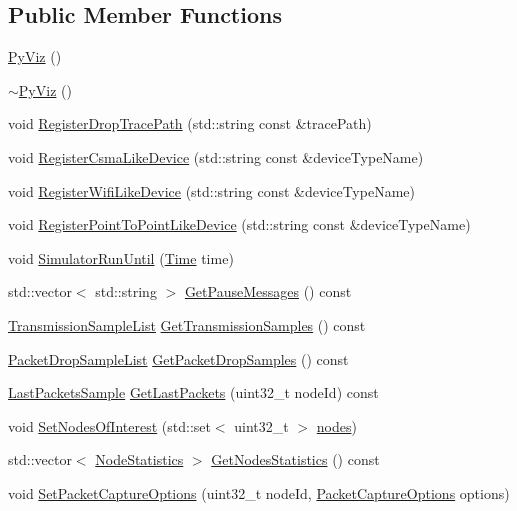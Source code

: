 \subsection*{Public Member Functions}
\begin{DoxyCompactItemize}
\item 
\hyperlink{classns3_1_1PyViz_ac8be400fd6c2f4054885d6b5a6015b81}{Py\+Viz} ()
\item 
\hyperlink{classns3_1_1PyViz_a65826ece1bbd08783e4aef13455aeb0d}{$\sim$\+Py\+Viz} ()
\item 
void \hyperlink{classns3_1_1PyViz_a0c6cee77874121b73c676d6a5d258fbf}{Register\+Drop\+Trace\+Path} (std\+::string const \&trace\+Path)
\item 
void \hyperlink{classns3_1_1PyViz_a222dd813791398f8bf76371dc9288772}{Register\+Csma\+Like\+Device} (std\+::string const \&device\+Type\+Name)
\item 
void \hyperlink{classns3_1_1PyViz_a8c41fd7483bc8fc914a41dc29e7e5b27}{Register\+Wifi\+Like\+Device} (std\+::string const \&device\+Type\+Name)
\item 
void \hyperlink{classns3_1_1PyViz_ab4fcab57c7fe0d3724b786e0cb9a6f63}{Register\+Point\+To\+Point\+Like\+Device} (std\+::string const \&device\+Type\+Name)
\item 
void \hyperlink{classns3_1_1PyViz_a55ad813c3ed010c6b5a269b7faa197fb}{Simulator\+Run\+Until} (\hyperlink{classns3_1_1Time}{Time} time)
\item 
std\+::vector$<$ std\+::string $>$ \hyperlink{classns3_1_1PyViz_aaa7efd1757c3b463b35d611d3ed2cfa1}{Get\+Pause\+Messages} () const 
\item 
\hyperlink{classns3_1_1PyViz_afef07a5e33f074ff5759906b90b885fb}{Transmission\+Sample\+List} \hyperlink{classns3_1_1PyViz_a2a3595e47e08e45f398219874e44b5a8}{Get\+Transmission\+Samples} () const 
\item 
\hyperlink{classns3_1_1PyViz_ad627eb91de7132e002dcd50e9d9248cd}{Packet\+Drop\+Sample\+List} \hyperlink{classns3_1_1PyViz_a9cb8328026f71bf926ef3f4ad05b038e}{Get\+Packet\+Drop\+Samples} () const 
\item 
\hyperlink{structns3_1_1PyViz_1_1LastPacketsSample}{Last\+Packets\+Sample} \hyperlink{classns3_1_1PyViz_a4b6549fc4648d59cba0e88c0667ca69a}{Get\+Last\+Packets} (uint32\+\_\+t node\+Id) const 
\item 
void \hyperlink{classns3_1_1PyViz_a64b56121856e6fe2446a00f78fa1511f}{Set\+Nodes\+Of\+Interest} (std\+::set$<$ uint32\+\_\+t $>$ \hyperlink{visualizer-ideas_8txt_a3e1b3808014a2c68ab0cd0182e041be2}{nodes})
\item 
std\+::vector$<$ \hyperlink{structns3_1_1PyViz_1_1NodeStatistics}{Node\+Statistics} $>$ \hyperlink{classns3_1_1PyViz_a85c89ff22032717bbda1785056ce1573}{Get\+Nodes\+Statistics} () const 
\item 
void \hyperlink{classns3_1_1PyViz_a1dcf066994c6bc22579aa32a71a04ecf}{Set\+Packet\+Capture\+Options} (uint32\+\_\+t node\+Id, \hyperlink{structns3_1_1PyViz_1_1PacketCaptureOptions}{Packet\+Capture\+Options} options)
\end{DoxyCompactItemize}
